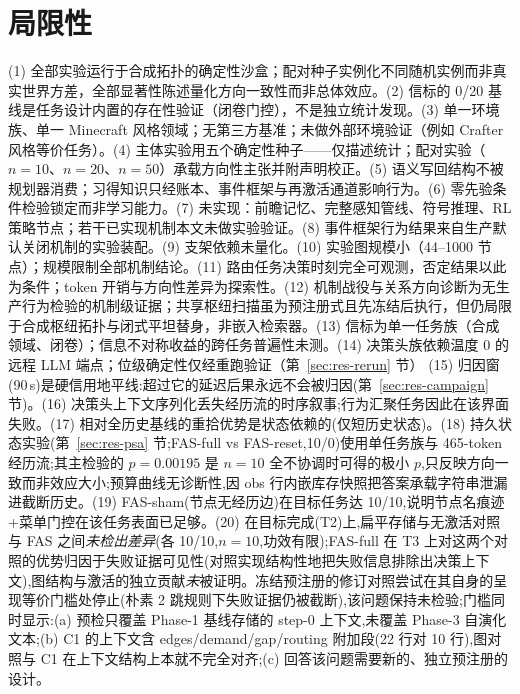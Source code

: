 \documentclass[10pt,a4paper]{ctexart}
\begin{document}
\section{局限性}
\label{sec:limits}
(1) 全部实验运行于合成拓扑的确定性沙盒；配对种子实例化不同随机实例而非真实世界方差，全部显著性陈述量化方向一致性而非总体效应。(2) 信标的 0/20 基线是任务设计内置的存在性验证（闭卷门控），不是独立统计发现。(3) 单一环境族、单一 Minecraft 风格领域；无第三方基准；未做外部环境验证（例如 Crafter 风格等价任务）。(4) 主体实验用五个确定性种子——仅描述统计；配对实验（$n{=}10$、$n{=}20$、$n{=}50$）承载方向性主张并附声明校正。(5) 语义写回结构不被规划器消费；习得知识只经账本、事件框架与再激活通道影响行为。(6) 零先验条件检验锁定而非学习能力。(7) 未实现：前瞻记忆、完整感知管线、符号推理、RL 策略节点；若干已实现机制本文未做实验验证。(8) 事件框架行为结果来自生产默认关闭机制的实验装配。(9) 支架依赖未量化。(10) 实验图规模小（44--1000 节点）；规模限制全部机制结论。(11) 路由任务决策时刻完全可观测，否定结果以此为条件；token 开销与方向性差异为探索性。(12) 机制战役与关系方向诊断为无生产行为检验的机制级证据；共享枢纽扫描虽为预注册式且先冻结后执行，但仍局限于合成枢纽拓扑与闭式平坦替身，非嵌入检索器。(13) 信标为单一任务族（合成领域、闭卷）；信息不对称收益的跨任务普遍性未测。(14) 决策头族依赖温度 0 的远程 LLM 端点；位级确定性仅经重跑验证（第~\ref{sec:res-rerun} 节） (15) 归因窗(90\,s)是硬信用地平线:超过它的延迟后果永远不会被归因(第~\ref{sec:res-campaign} 节)。(16) 决策头上下文序列化丢失经历流的时序叙事;行为汇聚任务因此在该界面失败。(17) 相对全历史基线的重拾优势是状态依赖的(仅短历史状态)。(18) 持久状态实验(第~\ref{sec:res-psa} 节;FAS-full vs FAS-reset,10/0)使用单任务族与 465-token 经历流;其主检验的 $p{=}0.00195$ 是 $n{=}10$ 全不协调时可得的极小 $p$,只反映方向一致而非效应大小;预算曲线无诊断性,因 obs 行内嵌库存快照把答案承载字符串泄漏进截断历史。(19) FAS-sham(节点无经历边)在目标任务达 10/10,说明节点名痕迹+菜单门控在该任务表面已足够。(20) 在目标完成(T2)上,扁平存储与无激活对照与 FAS 之间\emph{未检出差异}(各 10/10,$n{=}10$,功效有限);FAS-full 在 T3 上对这两个对照的优势归因于失败证据可见性(对照实现结构性地把失败信息排除出决策上下文),图结构与激活的独立贡献\emph{未}被证明。冻结预注册的修订对照尝试在其自身的呈现等价门槛处停止(朴素 2 跳规则下失败证据仍被截断),该问题保持未检验;门槛同时显示:(a) 预检只覆盖 Phase-1 基线存储的 step-0 上下文,未覆盖 Phase-3 自演化文本;(b) C1 的上下文含 edges/demand/gap/routing 附加段(22 行对 10 行),图对照与 C1 在上下文结构上本就不完全对齐;(c) 回答该问题需要新的、独立预注册的设计。
\end{document}

